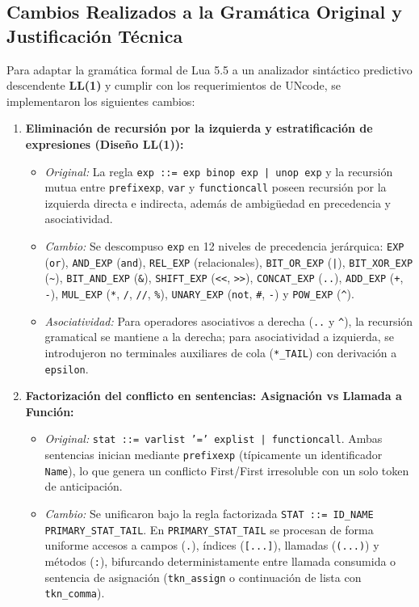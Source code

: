 \documentclass[10pt,letterpaper]{article}
\begin{document}
\subsection{Cambios Realizados a la Gramática Original y Justificación Técnica}

Para adaptar la gramática formal de Lua 5.5 a un analizador sintáctico predictivo descendente \textbf{LL(1)} y cumplir con los requerimientos de UNcode, se implementaron los siguientes cambios:

\begin{enumerate}
  \item \textbf{Eliminación de recursión por la izquierda y estratificación de expresiones (Diseño LL(1)):}
  \begin{itemize}
    \item \textit{Original:} La regla \texttt{exp ::= exp binop exp | unop exp} y la recursión mutua entre \texttt{prefixexp}, \texttt{var} y \texttt{functioncall} poseen recursión por la izquierda directa e indirecta, además de ambigüedad en precedencia y asociatividad.
    \item \textit{Cambio:} Se descompuso \texttt{exp} en 12 niveles de precedencia jerárquica: \texttt{EXP} (\texttt{or}), \texttt{AND\_EXP} (\texttt{and}), \texttt{REL\_EXP} (relacionales), \texttt{BIT\_OR\_EXP} (\texttt{|}), \texttt{BIT\_XOR\_EXP} (\texttt{\textasciitilde{}}), \texttt{BIT\_AND\_EXP} (\texttt{\&}), \texttt{SHIFT\_EXP} (\texttt{<{}<}, \texttt{>{}>}), \texttt{CONCAT\_EXP} (\texttt{..}), \texttt{ADD\_EXP} (\texttt{+}, \texttt{-}), \texttt{MUL\_EXP} (\texttt{*}, \texttt{/}, \texttt{//}, \texttt{\%}), \texttt{UNARY\_EXP} (\texttt{not}, \texttt{\#}, \texttt{-}) y \texttt{POW\_EXP} (\texttt{\textasciicircum{}}).
    \item \textit{Asociatividad:} Para operadores asociativos a derecha (\texttt{..} y \texttt{\textasciicircum{}}), la recursión gramatical se mantiene a la derecha; para asociatividad a izquierda, se introdujeron no terminales auxiliares de cola (\texttt{*\_TAIL}) con derivación a \texttt{epsilon}.
  \end{itemize}

  \item \textbf{Factorización del conflicto en sentencias: Asignación vs Llamada a Función:}
  \begin{itemize}
    \item \textit{Original:} \texttt{stat ::= varlist '=' explist | functioncall}. Ambas sentencias inician mediante \texttt{prefixexp} (típicamente un identificador \texttt{Name}), lo que genera un conflicto First/First irresoluble con un solo token de anticipación.
    \item \textit{Cambio:} Se unificaron bajo la regla factorizada \texttt{STAT ::= ID\_NAME PRIMARY\_STAT\_TAIL}. En \texttt{PRIMARY\_STAT\_TAIL} se procesan de forma uniforme accesos a campos (\texttt{.}), índices (\texttt{[...]}), llamadas (\texttt{(...)}) y métodos (\texttt{:}), bifurcando deterministamente entre llamada consumida o sentencia de asignación (\texttt{tkn\_assign} o continuación de lista con \texttt{tkn\_comma}).
  \end{itemize}


\end{enumerate}
\end{document}
